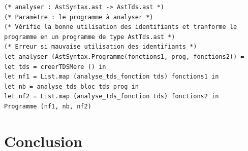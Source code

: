 \documentclass[11pt,a4paper]{article}
\begin{document}
\begin{verbatim}
(* analyser : AstSyntax.ast -> AstTds.ast *)
(* Paramètre : le programme à analyser *)
(* Vérifie la bonne utilisation des identifiants et tranforme le 
programme en un programme de type AstTds.ast *)
(* Erreur si mauvaise utilisation des identifiants *)
let analyser (AstSyntax.Programme(fonctions1, prog, fonctions2)) =
let tds = creerTDSMere () in
let nf1 = List.map (analyse_tds_fonction tds) fonctions1 in
let nb = analyse_tds_bloc tds prog in
let nf2 = List.map (analyse_tds_fonction tds) fonctions2 in
Programme (nf1, nb, nf2)
\end{verbatim}



\section{Conclusion}
\end{document}
